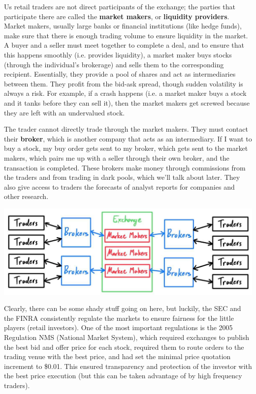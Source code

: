 \documentclass{article}
\begin{document}
    Us retail traders are not direct participants of the exchange; the parties that participate there are called the \textbf{market makers}, or \textbf{liquidity providers}. Market makers, usually large banks or financial institutions (like hedge funds), make sure that there is enough trading volume to ensure liquidity in the market. A buyer and a seller must meet together to complete a deal, and to ensure that this happens smoothly (i.e. provides liquidity), a market maker buys stocks (through the individual's brokerage) and sells them to the corresponding recipient. Essentially, they provide a pool of shares and act as intermediaries between them. They profit from the bid-ask spread, though sudden volatility is always a risk. For example, if a crash happens (i.e. a market maker buys a stock and it tanks before they can sell it), then the market makers get screwed because they are left with an undervalued stock. 

    The trader cannot directly trade through the market makers. They must contact their \textbf{broker}, which is another company that acts as an intermediary. If I want to buy a stock, my buy order gets sent to my broker, which gets sent to the market makers, which pairs me up with a seller through their own broker, and the transaction is completed. These brokers make money through commissions from the traders and from trading in dark pools, which we'll talk about later. They also give access to traders the forecasts of analyst reports for companies and other research. 

    \begin{center}
        \includegraphics[scale=0.3]{img/exchange.jpg}
    \end{center}

    Clearly, there can be some shady stuff going on here, but luckily, the SEC and the FINRA consistently regulate the markets to ensure fairness for the little players (retail investors). One of the most important regulations is the 2005 Regulation NMS (National Market System), which required exchanges to publish the best bid and offer price for each stock, required them to route orders to the trading venue with the best price, and had set the minimal price quotation increment to \$0.01. This ensured transparency and protection of the investor with the best price execution (but this can be taken advantage of by high frequency traders). 
\end{document}
